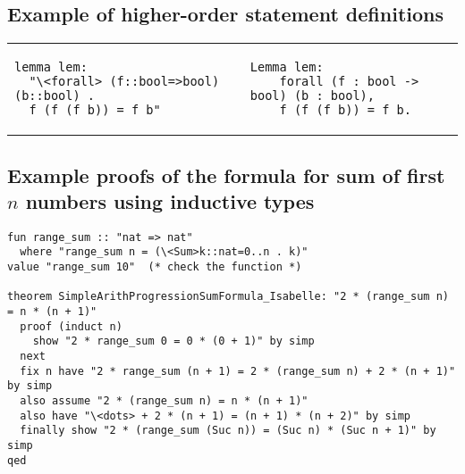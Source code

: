 \documentclass[article]{aaltoseries}
\begin{document}
\newpage
\subsection{Example of higher-order statement definitions}

\begin{raggedleft}
  \begin{tabular}{p{.48\linewidth} p{.48\linewidth}}
    \begin{lstlisting}[language=isabelle, caption={Higher-order statement definition in Isabelle}] 
lemma lem:
  "\<forall> (f::bool=>bool) (b::bool) .
  f (f (f b)) = f b"
    \end{lstlisting}
    &
    \begin{lstlisting}[language=coq, caption={Higher-order statement definition in Coq}]
Lemma lem: 
    forall (f : bool -> bool) (b : bool),
    f (f (f b)) = f b.
    \end{lstlisting}
  \end{tabular}
\end{raggedleft}


\newpage
\subsection{Example proofs of the formula for sum of first $n$ numbers using inductive types}
\label{apx:sum_inductive}

\begin{lstlisting}[language=isabelle, caption={Proof of the formula for sum of n first number in Isabelle}, label={ex_nat_sum_isabelle}]
fun range_sum :: "nat => nat"
  where "range_sum n = (\<Sum>k::nat=0..n . k)"
value "range_sum 10"  (* check the function *)

theorem SimpleArithProgressionSumFormula_Isabelle: "2 * (range_sum n) = n * (n + 1)"
  proof (induct n)
    show "2 * range_sum 0 = 0 * (0 + 1)" by simp
  next
  fix n have "2 * range_sum (n + 1) = 2 * (range_sum n) + 2 * (n + 1)" by simp
  also assume "2 * (range_sum n) = n * (n + 1)"
  also have "\<dots> + 2 * (n + 1) = (n + 1) * (n + 2)" by simp
  finally show "2 * (range_sum (Suc n)) = (Suc n) * (Suc n + 1)" by simp
qed
\end{lstlisting}
\end{document}
